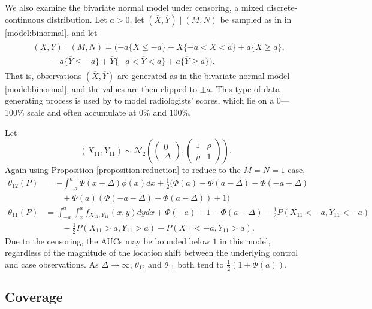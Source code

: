 \documentclass[12pt]{article}
\DeclareMathOperator{\AUC}{AUC}
\newcommand{\cind}{\perp \!\!\! \perp}
\newcommand{\aucindiv}{\theta_{11}}%
\newcommand{\aucpop}{\theta_{12}}%
\newcommand{\bnd}{a}
\begin{document}
We also examine the bivariate normal model under censoring, a mixed
discrete-continuous distribution. Let $\bnd>0$, let
$(\overline X,\overline Y)\mid (M,N)$ be sampled as in in
\eqref{model:binormal}, and let
\begin{gather}
  \begin{aligned}
    \label{model:censored binormal}
  &(X,Y) \mid (M,N) =(-\bnd\{\overline{X}\le-\bnd\}+\overline X\{-\bnd<\overline X <\bnd\} + a\{\overline X\ge a\},\\
  &\qquad
  -\bnd\{\overline{Y}\le-\bnd\}+\overline Y\{-\bnd<\overline Y <\bnd\} + a\{\overline Y\ge a\}).
\end{aligned}
\end{gather}
That is, observations $(\overline X,\overline Y)$ are generated as in the bivariate normal model
\eqref{model:binormal}, and the values are then clipped to $\pm \bnd$.
This type of data-generating process is used by \citet{obuchowski1997} to model
radiologists' scores, which lie on a 0---100\% scale and often
accumulate at $0\%$ and $100\%$.

Let
$$(X_{11},Y_{11})\sim \mathcal{N}_2\left(\begin{pmatrix} 0 \\ \Delta \end{pmatrix},
  \begin{pmatrix} 1 & \rho \\ \rho & 1 \end{pmatrix}
\right).$$
Again using Proposition \ref{proposition:reduction} to reduce to the $M=N=1$ case,
\begin{align}
  \aucpop(P) &=-\int_{-\bnd}^\bnd\Phi(x-\Delta)\phi(x)dx + \frac12(\Phi(\bnd)-\Phi(\bnd-\Delta)-\Phi(-\bnd-\Delta)\\
  &\qquad+\Phi(\bnd)(\Phi(-\bnd-\Delta)+\Phi(\bnd-\Delta))+1)\\
  \aucindiv(P) &=\int_{-\bnd}^\bnd\int_x^\bnd f_{X_{11},Y_{11}}(x,y)dydx + \Phi(-a) + 1 - \Phi(\bnd-\Delta) - \frac12 P(X_{11}<-\bnd,Y_{11}<-\bnd)\\
  &\qquad - \frac12 P(X_{11}>\bnd,Y_{11}>\bnd) - P(X_{11}< -\bnd, Y_{11}>\bnd).
\end{align}
Due to the censoring, the AUCs may be bounded below $1$ in this
model, regardless of the magnitude of the location shift between the underlying control and
case observations. As $\Delta\to\infty$, $\aucpop$ and $\aucindiv$
both tend to $\frac12(1+\Phi(\bnd))$.


\subsection{Coverage}\label{section:simulation:coverage}
\end{document}
